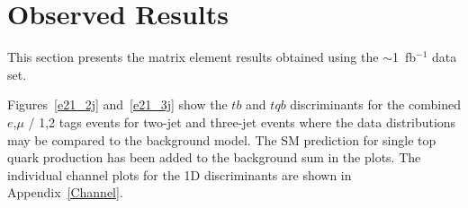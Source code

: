\section{Observed Results}
\label{results}

This section presents the matrix element results obtained using the
$\sim$1~fb$^{-1}$ data set.

Figures~\ref{e21_2j} and~\ref{e21_3j} show the $tb$ and $tqb$
discriminants for the combined $e$,$\mu$ / 1,2 tags events for two-jet
and three-jet events where the data distributions may be compared to
the background model.  The SM prediction for single top quark
production has been added to the background sum in the plots. The
individual channel plots for the 1D discriminants are shown in
Appendix~\ref{Channel}.

